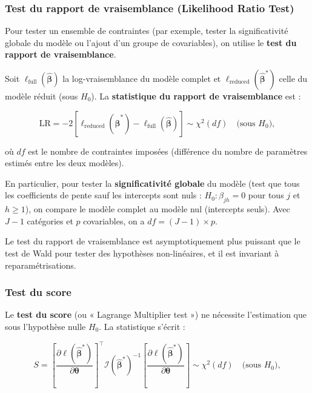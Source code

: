 \documentclass[12pt,a4paper]{article}
\begin{document}
\subsubsection{Test du rapport de vraisemblance (Likelihood Ratio Test)}

Pour tester un ensemble de contraintes (par exemple, tester la significativité globale du modèle ou l'ajout d'un groupe de covariables), on utilise le \textbf{test du rapport de vraisemblance}.

Soit $\ell_{\text{full}}(\widehat{\boldsymbol{\beta}})$ la log-vraisemblance du modèle complet et $\ell_{\text{reduced}}(\widehat{\boldsymbol{\beta}}^*)$ celle du modèle réduit (sous $H_0$). La \textbf{statistique du rapport de vraisemblance} est :

\begin{equation}\label{eq:lrt}
\text{LR} = -2 \left[ \ell_{\text{reduced}}(\widehat{\boldsymbol{\beta}}^*) - \ell_{\text{full}}(\widehat{\boldsymbol{\beta}}) \right] \sim \chi^2(df) \quad \text{(sous } H_0 \text{)},
\end{equation}

où $df$ est le nombre de contraintes imposées (différence du nombre de paramètres estimés entre les deux modèles).

En particulier, pour tester la \textbf{significativité globale} du modèle (test que tous les coefficients de pente sauf les intercepts sont nuls : $H_0 : \beta_{jh} = 0$ pour tous $j$ et $h \geq 1$), on compare le modèle complet au modèle nul (intercepts seuls). Avec $J-1$ catégories et $p$ covariables, on a $df = (J-1) \times p$.

Le test du rapport de vraisemblance est asymptotiquement plus puissant que le test de Wald pour tester des hypothèses non-linéaires, et il est invariant à reparamétrisations.

\subsubsection{Test du score}

Le \textbf{test du score} (ou « Lagrange Multiplier test ») ne nécessite l'estimation que sous l'hypothèse nulle $H_0$. La statistique s'écrit :

\begin{equation}
S = \left[ \frac{\partial \ell(\widehat{\boldsymbol{\beta}}^*)}{\partial \boldsymbol{\theta}} \right]^\top \mathcal{I}(\widehat{\boldsymbol{\beta}}^*)^{-1} \left[ \frac{\partial \ell(\widehat{\boldsymbol{\beta}}^*)}{\partial \boldsymbol{\theta}} \right] \sim \chi^2(df) \quad \text{(sous } H_0 \text{)},
\end{equation}
\end{document}
